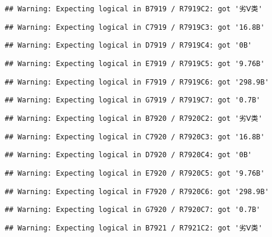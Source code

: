 \documentclass[
]{article}
\begin{document}
\begin{verbatim}
## Warning: Expecting logical in B7919 / R7919C2: got '劣Ⅴ类'
\end{verbatim}

\begin{verbatim}
## Warning: Expecting logical in C7919 / R7919C3: got '16.8B'
\end{verbatim}

\begin{verbatim}
## Warning: Expecting logical in D7919 / R7919C4: got '0B'
\end{verbatim}

\begin{verbatim}
## Warning: Expecting logical in E7919 / R7919C5: got '9.76B'
\end{verbatim}

\begin{verbatim}
## Warning: Expecting logical in F7919 / R7919C6: got '298.9B'
\end{verbatim}

\begin{verbatim}
## Warning: Expecting logical in G7919 / R7919C7: got '0.7B'
\end{verbatim}

\begin{verbatim}
## Warning: Expecting logical in B7920 / R7920C2: got '劣Ⅴ类'
\end{verbatim}

\begin{verbatim}
## Warning: Expecting logical in C7920 / R7920C3: got '16.8B'
\end{verbatim}

\begin{verbatim}
## Warning: Expecting logical in D7920 / R7920C4: got '0B'
\end{verbatim}

\begin{verbatim}
## Warning: Expecting logical in E7920 / R7920C5: got '9.76B'
\end{verbatim}

\begin{verbatim}
## Warning: Expecting logical in F7920 / R7920C6: got '298.9B'
\end{verbatim}

\begin{verbatim}
## Warning: Expecting logical in G7920 / R7920C7: got '0.7B'
\end{verbatim}

\begin{verbatim}
## Warning: Expecting logical in B7921 / R7921C2: got '劣Ⅴ类'
\end{verbatim}
\end{document}

